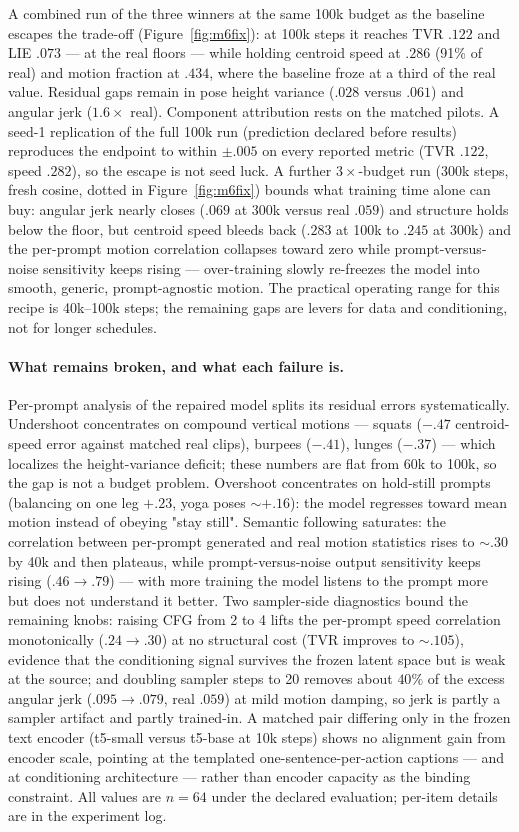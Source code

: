 \documentclass[10pt,twocolumn]{article}
\begin{document}
A combined run of the three winners at the same 100k budget as the baseline escapes the trade-off
(Figure~\ref{fig:m6fix}): at 100k steps it reaches TVR $.122$ and LIE $.073$ — at the real floors — while holding
centroid speed at $.286$ (91\% of real) and motion fraction at $.434$, where the baseline froze at a third of the
real value. Residual gaps remain in pose height variance ($.028$ versus $.061$) and angular jerk ($1.6\times$ real).
Component attribution rests on the matched pilots. A seed-1 replication of the full 100k run (prediction declared before results) reproduces the endpoint to within $\pm.005$ on every reported metric (TVR $.122$, speed $.282$), so the escape is not seed luck. A further $3\times$-budget run
(300k steps, fresh cosine, dotted in Figure~\ref{fig:m6fix}) bounds what training time alone can buy: angular jerk
nearly closes ($.069$ at 300k versus real $.059$) and structure holds below the floor, but centroid speed bleeds
back ($.283$ at 100k to $.245$ at 300k) and the per-prompt motion correlation collapses toward zero while
prompt-versus-noise sensitivity keeps rising — over-training slowly re-freezes the model into smooth, generic,
prompt-agnostic motion. The practical operating range for this recipe is 40k--100k steps; the remaining gaps are
levers for data and conditioning, not for longer schedules.

\paragraph{What remains broken, and what each failure is.} Per-prompt analysis of the repaired model splits its
residual errors systematically. Undershoot concentrates on compound vertical motions — squats ($-.47$ centroid-speed
error against matched real clips), burpees ($-.41$), lunges ($-.37$) — which localizes the height-variance deficit;
these numbers are flat from 60k to 100k, so the gap is not a budget problem. Overshoot concentrates on hold-still
prompts (balancing on one leg $+.23$, yoga poses ${\sim}{+}.16$): the model regresses toward mean motion instead of
obeying "stay still". Semantic following saturates: the correlation between per-prompt generated and real motion
statistics rises to ${\sim}.30$ by 40k and then plateaus, while prompt-versus-noise output sensitivity keeps rising
($.46{\to}.79$) — with more training the model listens to the prompt more but does not understand it better. Two
sampler-side diagnostics bound the remaining knobs: raising CFG from 2 to 4 lifts the per-prompt speed correlation
monotonically ($.24{\to}.30$) at no structural cost (TVR improves to ${\sim}.105$), evidence that the conditioning
signal survives the frozen latent space but is weak at the source; and doubling sampler steps to 20 removes about
$40\%$ of the excess angular jerk ($.095{\to}.079$, real $.059$) at mild motion damping, so jerk is partly a sampler
artifact and partly trained-in. A matched pair differing only in the frozen text encoder (t5-small versus t5-base at
10k steps) shows no alignment gain from encoder scale, pointing at the templated one-sentence-per-action captions —
and at conditioning architecture — rather than encoder capacity as the binding constraint. All values are $n{=}64$
under the declared evaluation; per-item details are in the experiment log.
\end{document}
